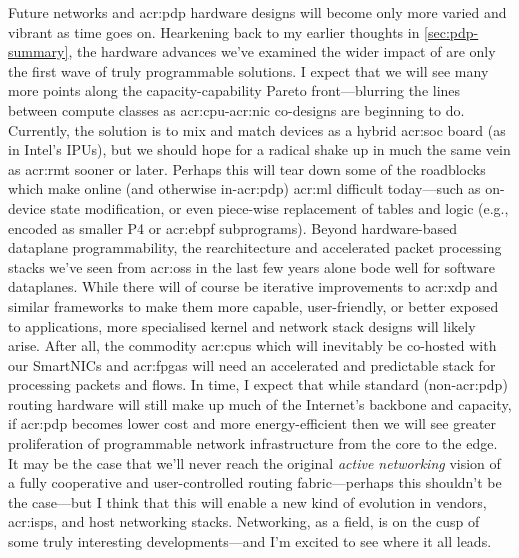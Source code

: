 
Future networks and \gls{acr:pdp} hardware designs will become only more varied and vibrant as time goes on.
Hearkening back to my earlier thoughts in \cref{sec:pdp-summary}, the hardware advances we've examined the wider impact of are only the first wave of truly programmable solutions.
I expect that we will see many more points along the capacity-capability Pareto front---blurring the lines between compute classes as \gls{acr:cpu}-\gls{acr:nic} co-designs are beginning to do.
Currently, the solution is to mix and match devices as a hybrid \gls{acr:soc} board (as in Intel's IPUs), but we should hope for a radical shake up in much the same vein as \gls{acr:rmt} sooner or later.
Perhaps this will tear down some of the roadblocks which make online (and otherwise in-\gls{acr:pdp}) \gls{acr:ml} difficult today---such as on-device state modification, or even piece-wise replacement of tables and logic (e.g., encoded as smaller P4 or \gls{acr:ebpf} subprograms).
Beyond hardware-based dataplane programmability, the rearchitecture and accelerated packet processing stacks we've seen from \glspl{acr:os} in the last few years alone bode well for software dataplanes.
While there will of course be iterative improvements to \gls{acr:xdp} and similar frameworks to make them more capable, user-friendly, or better exposed to applications, more specialised kernel and network stack designs will likely arise.
After all, the commodity \glspl{acr:cpu} which will inevitably be co-hosted with our SmartNICs and \glspl{acr:fpga} will need an accelerated and predictable stack for processing packets and flows.
In time, I expect that while standard (non-\gls{acr:pdp}) routing hardware will still make up much of the Internet's backbone and capacity, if \gls{acr:pdp} becomes lower cost and more energy-efficient then we will see greater proliferation of programmable network infrastructure from the core to the edge.
It may be the case that we'll never reach the original \emph{active networking} vision of a fully cooperative and user-controlled routing fabric---perhaps this shouldn't be the case---but I think that this will enable a new kind of evolution in vendors, \glspl{acr:isp}, and host networking stacks.
Networking, as a field, is on the cusp of some truly interesting developments---and I'm excited to see where it all leads.

